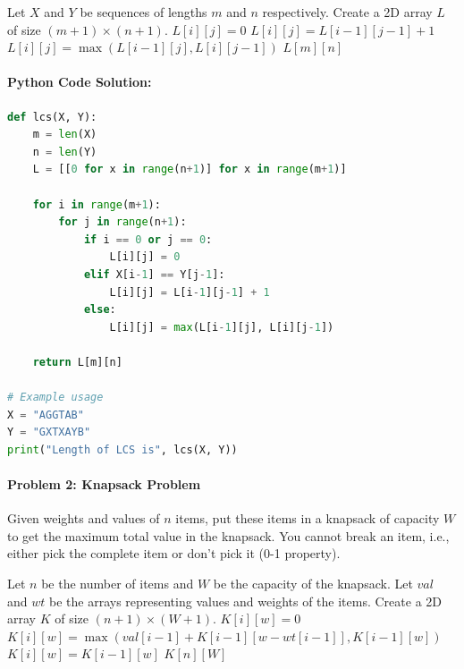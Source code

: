 \documentclass[12pt]{book} %
\begin{document}
\begin{algorithm}
\caption{Longest Common Subsequence}
\begin{algorithmic}[1]
\State Let $X$ and $Y$ be sequences of lengths $m$ and $n$ respectively.
\State Create a 2D array $L$ of size $(m+1) \times (n+1)$.
            \State $L[i][j] = 0$
            \State $L[i][j] = L[i-1][j-1] + 1$
        \Else
            \State $L[i][j] = \max(L[i-1][j], L[i][j-1])$
        \EndIf
    \EndFor
\EndFor
\Return $L[m][n]$
\end{algorithmic}
\end{algorithm}

\paragraph{Python Code Solution:}
\FloatBarrier
\begin{lstlisting}[language=Python, caption=Longest Common Subsequence]
def lcs(X, Y):
    m = len(X)
    n = len(Y)
    L = [[0 for x in range(n+1)] for x in range(m+1)]

    for i in range(m+1):
        for j in range(n+1):
            if i == 0 or j == 0:
                L[i][j] = 0
            elif X[i-1] == Y[j-1]:
                L[i][j] = L[i-1][j-1] + 1
            else:
                L[i][j] = max(L[i-1][j], L[i][j-1])

    return L[m][n]

# Example usage
X = "AGGTAB"
Y = "GXTXAYB"
print("Length of LCS is", lcs(X, Y))
\end{lstlisting}
\FloatBarrier

\paragraph{Problem 2: Knapsack Problem}
Given weights and values of $n$ items, put these items in a knapsack of capacity $W$ to get the maximum total value in the knapsack. You cannot break an item, i.e., either pick the complete item or don’t pick it (0-1 property).

\begin{algorithm}
\caption{0-1 Knapsack Problem}
\begin{algorithmic}[1]
\State Let $n$ be the number of items and $W$ be the capacity of the knapsack.
\State Let $val$ and $wt$ be the arrays representing values and weights of the items.
\State Create a 2D array $K$ of size $(n+1) \times (W+1)$.
            \State $K[i][w] = 0$
            \State $K[i][w] = \max(val[i-1] + K[i-1][w-wt[i-1]], K[i-1][w])$
        \Else
            \State $K[i][w] = K[i-1][w]$
        \EndIf
    \EndFor
\EndFor
\Return $K[n][W]$
\end{algorithmic}
\end{algorithm}
\end{document}
